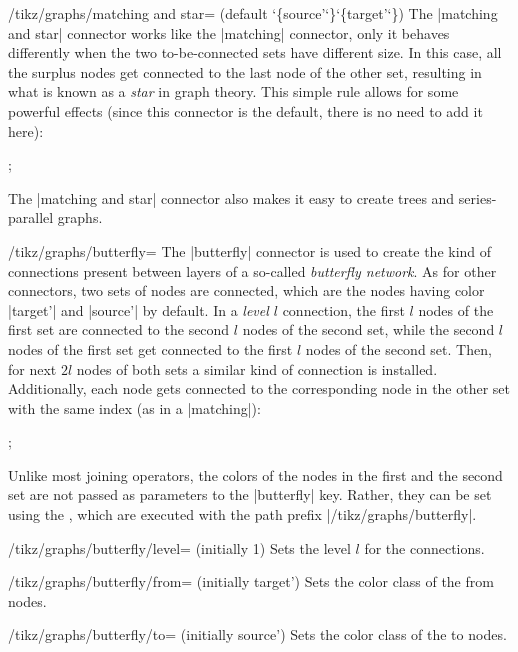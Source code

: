 \begin{key}{/tikz/graphs/matching and star= (default \char`\{source'\char`\}\char`\{target'\char`\})}
  The |matching and star| connector works like the |matching|
  connector, only it behaves differently when the two to-be-connected
  sets have different size. In this case, all the surplus nodes get
  connected to the last node of the other set, resulting in what is known
  as a \emph{star} in graph theory. This simple rule allows
  for some powerful effects (since this connector is the default,
  there is no need to add it here):
  \begin{codeexample}[]
\tikz {};    
  \end{codeexample}
  The |matching and star| connector also makes it easy to create trees and
  series-parallel graphs.
\end{key}

\begin{key}{/tikz/graphs/butterfly=}
  The |butterfly| connector is used to create the kind of connections
  present between layers of a so-called \emph{butterfly network}.
  As for other connectors, two sets of nodes are connected, which are
  the nodes having color |target'| and |source'| by default. In a
  \emph{level $l$} connection, the first $l$ nodes of the first set
  are connected to the second $l$ nodes of the second set, while the
  second $l$ nodes of the first set get connected to the first $l$
  nodes of the second set. Then, for next $2l$ nodes of both sets a
  similar kind of connection is installed. Additionally, each node
  gets connected to the corresponding node in the other set with the
  same index (as in a |matching|):
\begin{codeexample}[]
\tikz {};
\end{codeexample}
  Unlike most joining operators, the colors of the nodes in the first
  and the second set are not passed as parameters to the |butterfly|
  key. Rather, they can be set using the , which are
  executed with the path prefix |/tikz/graphs/butterfly|.
  \begin{key}{/tikz/graphs/butterfly/level= (initially 1)}
    Sets the level $l$ for the connections.
  \end{key}
  \begin{key}{/tikz/graphs/butterfly/from= (initially target')}
    Sets the color class of the from nodes.
  \end{key}
  \begin{key}{/tikz/graphs/butterfly/to= (initially source')}
    Sets the color class of the to nodes.
  \end{key}
\end{key}



